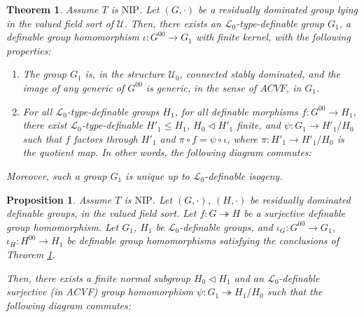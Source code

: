\documentclass[10pt,a4paper]{amsart}
\newtheorem{thm}{Theorem}
\newtheorem{prop}{Proposition}
\newcommand{\NIP}{\mathrm{NIP}}
\newcommand{\U}{\mathcal{U}}
\newcommand{\Ualg}{\mathcal{U}_0}
\begin{document}
\begin{thm}\label{thm_acvf_enveloppe} Assume $T$ is $\NIP$.
    Let $(G,\cdot)$ be a residually dominated group lying in the valued field sort of $\U$. Then, there exists an $\mathcal{L}_0$-type-definable group $G_1$, a definable group homomorphism $\iota: G^{00} \rightarrow G_1$ with finite kernel, with the following properties:

    \begin{enumerate}
        \item The group $G_1$ is, in the structure $\Ualg$, connected stably dominated, and the image of any generic of $G^{00}$ is generic, in the sense of $ACVF$, in $G_1$.
        
        \item For all $\mathcal{L}_0$-type-definable groups $H_1$, for all definable morphisms $f: G^{00} \rightarrow H_1$, there exist $\mathcal{L}_0$-type-definable $H'_1 \leq H_1$, $H_0 \lhd H'_1$ finite, and $\psi: G_1 \rightarrow H'_1/H_0$ such that $f$ factors through $H'_1$ and $\pi \circ f = \psi \circ \iota$, where $\pi : H'_1 \rightarrow H'_1 / H_0$ is the quotient map. In other words, the following diagram commutes:
    \end{enumerate}

\begin{center}
\end{center}

    Moreover, such a group $G_1$ is unique up to $\mathcal{L}_0$-definable isogeny. 
\end{thm}

\begin{prop}\label{prop_functoriality} Assume $T$ is $\NIP$. Let $(G, \cdot)$, $(H, \cdot)$ be residually dominated definable groups, in the valued field sort. Let $f: G \twoheadrightarrow H$ be a surjective definable group homomorphism. Let $G_1$, $H_1$ be $\mathcal{L}_0$-definable groups, and $\iota_G: G^{00} \rightarrow G_1$, $\iota_H: H^{00} \rightarrow H_1$ be definable group homomorphisms satisfying the conclusions of Theorem \ref{thm_acvf_enveloppe}.


Then, there exists a finite normal subgroup $H_0 \lhd H_1$ and an $\mathcal{L}_0$-definable surjective (in ACVF) group homomorphism $\psi: G_1 \twoheadrightarrow H_1 / H_0$ such that the following diagram commutes:

\begin{center}
\end{center}

\end{prop}
\end{document}
